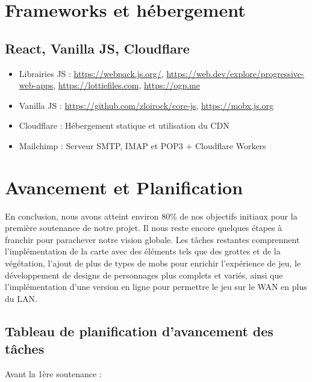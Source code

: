\documentclass[
	article,			%
	11pt,				%
	oneside,			%
	a4paper,			%
	chapter=TITLE,
	french,			%
	sumario=tradicional
	]{base_nt}
\begin{document}
\section{Frameworks et hébergement}

\subsection{React, Vanilla JS, Cloudflare}

\begin{itemize}
    \item Librairies JS :  \url{https://webpack.js.org/}, \url{https://web.dev/explore/progressive-web-apps}, \url{https://lottiefiles.com}, \url{https://ogp.me}
    \item Vanilla JS : \url{https://github.com/zloirock/core-js}, \url{https://mobx.js.org}
\end{itemize}

\begin{itemize}
    \item Cloudflare : Hébergement statique et utilisation du CDN
    \item Mailchimp : Serveur SMTP, IMAP et POP3 + Cloudflare Workers
\end{itemize}

\newpage

\section{Avancement et Planification}

En conclusion, nous avons atteint environ 80\% de nos objectifs initiaux pour la première soutenance de notre projet. Il nous reste encore quelques étapes à franchir pour parachever notre vision globale. Les tâches restantes comprennent l'implémentation de la carte avec des éléments tels que des grottes et de la végétation, l'ajout de plus de types de mobs pour enrichir l'expérience de jeu, le développement de designs de personnages plus complets et variés, ainsi que l'implémentation d'une version en ligne pour permettre le jeu sur le WAN en plus du LAN.

\newpage

\subsection{Tableau de planification d'avancement des tâches}

Avant la 1ère soutenance :
\end{document}
